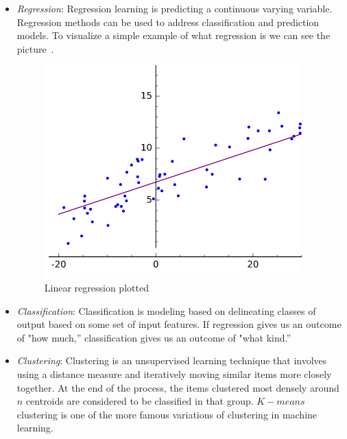 \begin{itemize}
	\item \textit{Regression}: Regression learning is predicting a continuous varying variable. Regression methods can be used to address classification and prediction models. To visualize a simple example of what regression is we can see the picture~.
	\begin{figure}
		\centering
		\includegraphics[scale=1.6]{img/regression.png}
		\caption{Linear regression plotted~\cite{tfidf}}
		\label{fig:regresion}
	\end{figure}
	\item \textit{Classification}: Classification is modeling based on delineating classes of output based on some set of input features. If regression gives us an outcome of "how much,” classification gives us an outcome of "what kind.”
	\item \textit{Clustering}: Clustering is an unsupervised learning technique that involves using a distance measure and iteratively moving similar items more closely together. At the end of the process, the items clustered most densely around $n$ centroids are considered to be classified in that group. $K-means$ clustering is one of the more famous variations of clustering in machine learning. 
\end{itemize} 

